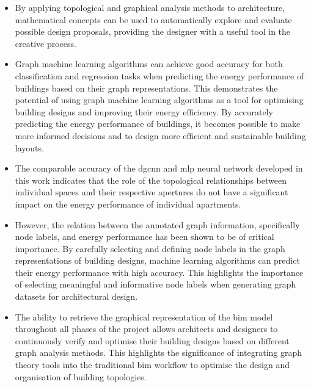 \documentclass[a4paper, 12pt]{report}
\begin{document}
\begin{itemize}

\item By applying topological and graphical analysis methods to architecture, mathematical concepts can be used to automatically explore and evaluate possible design proposals, providing the designer with a useful tool in the creative process.

\item Graph machine learning algorithms can achieve good accuracy for both classification and regression tasks when predicting the energy performance of buildings based on their graph representations. This demonstrates the potential of using graph machine learning algorithms as a tool for optimising building designs and improving their energy efficiency. By accurately predicting the energy performance of buildings, it becomes possible to make more informed decisions and to design more efficient and sustainable building layouts.

\item The comparable accuracy of the \acrlong{dgcnn} and \acrlong{mlp} neural network developed in this work indicates that the role of the topological relationships between individual spaces and their respective \glspl{aperture} do not have a significant impact on the energy performance of individual apartments.

\item However, the relation between the annotated graph information, specifically node labels, and energy performance has been shown to be of critical importance. By carefully selecting and defining node labels in the graph representations of building designs, machine learning algorithms can predict their energy performance with high accuracy. This highlights the importance of selecting meaningful and informative node labels when generating graph datasets for architectural design.

\item The ability to retrieve the graphical representation of the \acrshort{bim} model throughout all phases of the project allows architects and designers to continuously verify and optimise their building designs based on different graph analysis methods. This highlights the significance of integrating graph theory tools into the traditional \acrshort{bim} workflow to optimise the design and organisation of building topologies.

\end{itemize}
\end{document}
